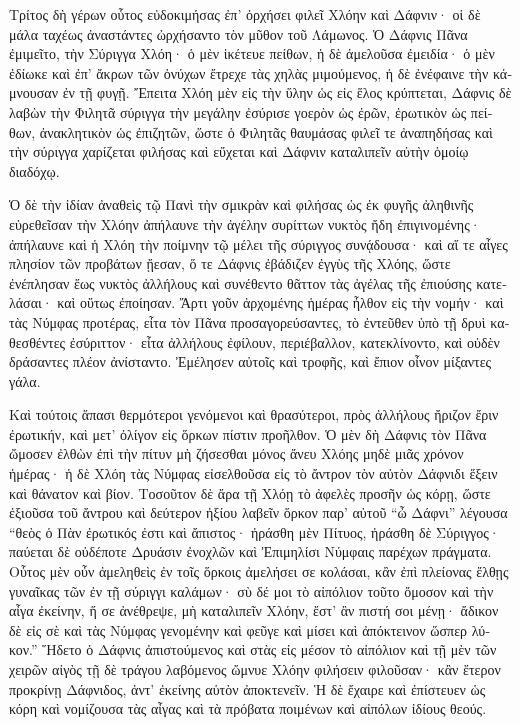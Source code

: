 \documentclass{book}
\begin{document}
\begin{pairs}
\begin{Leftside}
\begin{greek}
  Τρίτος δὴ γέρων οὗτος εὐδοκιμήσας ἐπ’ ὀρχήσει φιλεῖ Χλόην καὶ Δάφνιν· οἱ δὲ μάλα ταχέως ἀναστάντες ὠρχήσαντο τὸν μῦθον τοῦ Λάμωνος. Ὁ Δάφνις Πᾶνα ἐμιμεῖτο, τὴν Σύριγγα Χλόη· ὁ μὲν ἱκέτευε πείθων, ἡ δὲ ἀμελοῦσα ἐμειδία·  ὁ μὲν ἐδίωκε καὶ ἐπ’ ἄκρων τῶν ὀνύχων ἔτρεχε τὰς χηλὰς μιμούμενος, ἡ δὲ ἐνέφαινε τὴν κάμνουσαν ἐν τῇ φυγῇ. Ἔπειτα Χλόη μὲν εἰς τὴν ὕλην ὡς εἰς ἕλος κρύπτεται, Δάφνις  δὲ λαβὼν τὴν Φιλητᾶ σύριγγα τὴν μεγάλην ἐσύρισε γοερὸν ὡς ἐρῶν, ἐρωτικὸν ὡς πείθων, ἀνακλητικὸν ὡς ἐπιζητῶν, ὥστε ὁ Φιλητᾶς θαυμάσας φιλεῖ τε ἀναπηδήσας καὶ τὴν σύριγγα χαρίζεται φιλήσας καὶ εὔχεται καὶ Δάφνιν καταλιπεῖν αὐτὴν ὁμοίῳ διαδόχῳ.
\pend


  Ὁ δὲ τὴν ἰδίαν ἀναθεὶς τῷ Πανὶ τὴν σμικρὰν καὶ φιλήσας ὡς ἐκ φυγῆς ἀληθινῆς εὑρεθεῖσαν τὴν Χλόην ἀπήλαυνε τὴν ἀγέλην συρίττων νυκτὸς ἤδη ἐπιγινομένης· ἀπήλαυνε καὶ ἡ Χλόη τὴν ποίμνην τῷ μέλει τῆς σύριγγος συνᾴδουσα·  καὶ αἵ τε αἶγες πλησίον τῶν προβάτων ᾔεσαν, ὅ τε Δάφνις ἐβάδιζεν ἐγγὺς τῆς Χλόης, ὥστε ἐνέπλησαν ἕως νυκτὸς ἀλλήλους καὶ συνέθεντο θᾶττον τὰς ἀγέλας τῆς ἐπιούσης κατελάσαι·  καὶ οὕτως ἐποίησαν. Ἄρτι γοῦν ἀρχομένης ἡμέρας ἦλθον εἰς τὴν νομήν· καὶ τὰς Νύμφας προτέρας, εἶτα τὸν Πᾶνα προσαγορεύσαντες, τὸ ἐντεῦθεν ὑπὸ τῇ δρυὶ καθεσθέντες ἐσύριττον· εἶτα ἀλλήλους ἐφίλουν, περιέβαλλον, κατεκλίνοντο, καὶ οὐδὲν δράσαντες πλέον ἀνίσταντο. Ἐμέλησεν αὐτοῖς καὶ τροφῆς, καὶ ἔπιον οἶνον μίξαντες γάλα.
\pend


  Καὶ τούτοις ἅπασι θερμότεροι γενόμενοι καὶ θρασύτεροι, πρὸς ἀλλήλους ἤριζον ἔριν ἐρωτικήν, καὶ μετ’ ὀλίγον εἰς ὅρκων πίστιν προῆλθον. Ὁ μὲν δὴ Δάφνις τὸν Πᾶνα ὤμοσεν ἐλθὼν ἐπὶ τὴν πίτυν μὴ ζήσεσθαι μόνος ἄνευ Χλόης μηδὲ μιᾶς χρόνον ἡμέρας·  ἡ δὲ Χλόη τὰς Νύμφας εἰσελθοῦσα εἰς τὸ ἄντρον τὸν αὐτὸν Δάφνιδι ἕξειν καὶ θάνατον καὶ βίον. Τοσοῦτον δὲ ἄρα τῇ Χλόῃ τὸ ἀφελὲς προσῆν ὡς κόρῃ, ὥστε ἐξιοῦσα τοῦ ἄντρου καὶ δεύτερον ἠξίου λαβεῖν ὅρκον παρ’ αὐτοῦ “ὦ Δάφνι” λέγουσα “θεὸς ὁ Πὰν ἐρωτικός ἐστι καὶ ἄπιστος·  ἠράσθη μὲν Πίτυος, ἠράσθη δὲ Σύριγγος· παύεται δὲ οὐδέποτε Δρυάσιν ἐνοχλῶν καὶ Ἐπιμηλίσι Νύμφαις παρέχων πράγματα. Οὗτος μὲν οὖν ἀμεληθεὶς ἐν τοῖς ὅρκοις ἀμελήσει σε κολάσαι, κἂν ἐπὶ πλείονας ἔλθῃς γυναῖκας τῶν ἐν τῇ σύριγγι καλάμων·  σὺ δέ μοι τὸ αἰπόλιον τοῦτο ὄμοσον καὶ τὴν αἶγα ἐκείνην, ἥ σε ἀνέθρεψε, μὴ καταλιπεῖν Χλόην, ἔστ’ ἂν πιστή σοι μένῃ· ἄδικον δὲ εἰς σὲ καὶ τὰς Νύμφας γενομένην καὶ φεῦγε καὶ μίσει καὶ ἀπόκτεινον ὥσπερ λύκον.”  Ἥδετο ὁ Δάφνις ἀπιστούμενος καὶ στὰς εἰς μέσον τὸ αἰπόλιον καὶ τῇ μὲν τῶν χειρῶν αἰγὸς τῇ δὲ τράγου λαβόμενος ὤμνυε Χλόην φιλήσειν φιλοῦσαν· κἂν ἕτερον προκρίνῃ Δάφνιδος, ἀντ’ ἐκείνης αὑτὸν ἀποκτενεῖν.  Ἡ δὲ ἔχαιρε καὶ ἐπίστευεν ὡς κόρη καὶ νομίζουσα τὰς αἶγας καὶ τὰ πρόβατα ποιμένων καὶ αἰπόλων ἰδίους θεούς.
\pend



\end{greek}
\end{Leftside}
\end{pairs}
\end{document}
